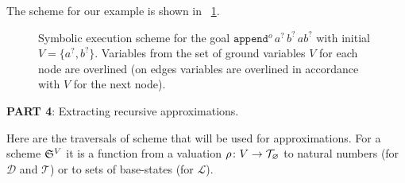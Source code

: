 The scheme for our example is shown in \figureword~\ref{fig:example_scheme}.

\begin{figure}[t]
\begin{center}
\end{center}

\caption{Symbolic execution scheme for the goal $\texttt{append$^o$} \, a^? \, b^? \, ab^?$ with initial $V = \{ a^?, b^? \}$. Variables from the set of ground variables $V$ for each node are overlined (on edges variables are overlined in accordance with $V$ for the next node). }
\label{fig:example_scheme}
\end{figure}


\colorbox{blue!20}{\parbox{\textwidth}{\textbf{PART 4}: Extracting recursive approximations.}}

Here are the traversals of scheme that will be used for approximations. For a scheme ${\mathfrak{S}}^{V}$ it is a function from a valuation $\rho \colon V \to \mathcal{T}_{\varnothing}$ to natural numbers (for $\mathcal{D}$ and $\mathcal{T}$) or to sets of base-states (for $\mathcal{L}$).

